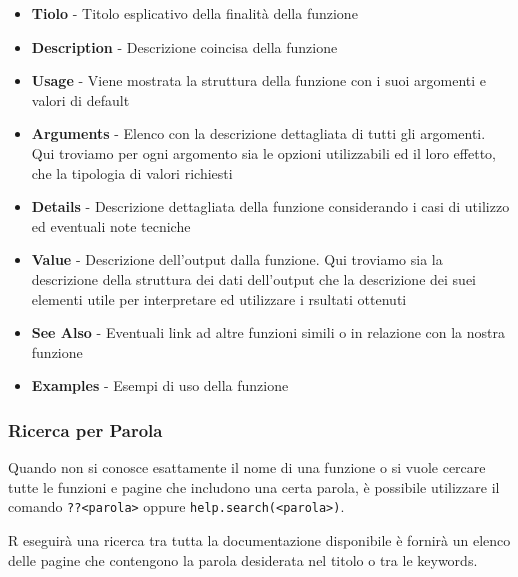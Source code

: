 \documentclass[
]{book}
\providecommand{\tightlist}{%
  \setlength{\itemsep}{0pt}\setlength{\parskip}{0pt}}
\begin{document}
\begin{itemize}
\tightlist
\item
  \textbf{Tiolo} - Titolo esplicativo della finalità della funzione\\
\item
  \textbf{Description} - Descrizione coincisa della funzione
\item
  \textbf{Usage} - Viene mostrata la struttura della funzione con i suoi argomenti e valori di default
\item
  \textbf{Arguments} - Elenco con la descrizione dettagliata di tutti gli argomenti. Qui troviamo per ogni argomento sia le opzioni utilizzabili ed il loro effetto, che la tipologia di valori richiesti
\item
  \textbf{Details} - Descrizione dettagliata della funzione considerando i casi di utilizzo ed eventuali note tecniche
\item
  \textbf{Value} - Descrizione dell'output dalla funzione. Qui troviamo sia la descrizione della struttura dei dati dell'output che la descrizione dei suei elementi utile per interpretare ed utilizzare i rsultati ottenuti
\item
  \textbf{See Also} - Eventuali link ad altre funzioni simili o in relazione con la nostra funzione
\item
  \textbf{Examples} - Esempi di uso della funzione
\end{itemize}

\hypertarget{ricerca-per-parola}{%
\subsubsection*{Ricerca per Parola}\label{ricerca-per-parola}}

Quando non si conosce esattamente il nome di una funzione o si vuole cercare tutte le funzioni e pagine che includono una certa parola, è possibile utilizzare il comando \texttt{??\textless{}parola\textgreater{}} oppure \texttt{help.search(\textless{}parola\textgreater{})}.

R eseguirà una ricerca tra tutta la documentazione disponibile è fornirà un elenco delle pagine che contengono la parola desiderata nel titolo o tra le keywords.
\end{document}
